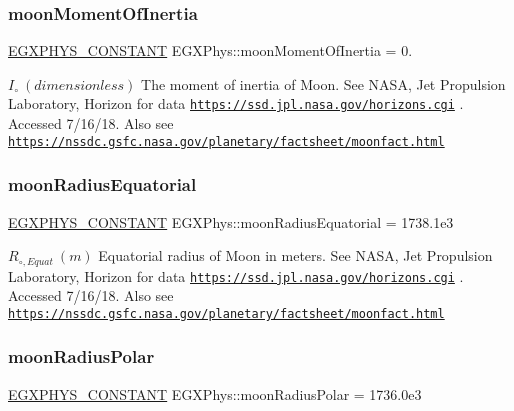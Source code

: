 \subsubsection{\texorpdfstring{moon\+Moment\+Of\+Inertia}{moonMomentOfInertia}}
{\footnotesize\ttfamily \mbox{\hyperlink{group___e_g_x_phys-_constants-_macros_ga76980d288494ce1714c9ac68a95ba702}{E\+G\+X\+P\+H\+Y\+S\+\_\+\+C\+O\+N\+S\+T\+A\+NT}} E\+G\+X\+Phys\+::moon\+Moment\+Of\+Inertia = 0.}

$ I_{\circ} \ (dimensionless)$ The moment of inertia of Moon. See N\+A\+SA, Jet Propulsion Laboratory, Horizon for data \href{https://ssd.jpl.nasa.gov/horizons.cgi}{\tt https\+://ssd.\+jpl.\+nasa.\+gov/horizons.\+cgi} . Accessed 7/16/18. Also see \href{https://nssdc.gsfc.nasa.gov/planetary/factsheet/moonfact.html}{\tt https\+://nssdc.\+gsfc.\+nasa.\+gov/planetary/factsheet/moonfact.\+html} \mbox{\label{group___e_g_x_phys-_constants-_astrophysics-_solar_system-_moon-_bulk_gae64b2ac5706df380350586a156c2fef9}} 
\subsubsection{\texorpdfstring{moon\+Radius\+Equatorial}{moonRadiusEquatorial}}
{\footnotesize\ttfamily \mbox{\hyperlink{group___e_g_x_phys-_constants-_macros_ga76980d288494ce1714c9ac68a95ba702}{E\+G\+X\+P\+H\+Y\+S\+\_\+\+C\+O\+N\+S\+T\+A\+NT}} E\+G\+X\+Phys\+::moon\+Radius\+Equatorial = 1738.\+1e3}

$R_{\circ,Equat} \ (m)$ Equatorial radius of Moon in meters. See N\+A\+SA, Jet Propulsion Laboratory, Horizon for data \href{https://ssd.jpl.nasa.gov/horizons.cgi}{\tt https\+://ssd.\+jpl.\+nasa.\+gov/horizons.\+cgi} . Accessed 7/16/18. Also see \href{https://nssdc.gsfc.nasa.gov/planetary/factsheet/moonfact.html}{\tt https\+://nssdc.\+gsfc.\+nasa.\+gov/planetary/factsheet/moonfact.\+html} \mbox{\label{group___e_g_x_phys-_constants-_astrophysics-_solar_system-_moon-_bulk_ga63eac19f90f28a0639f9a81eaac65d62}} 
\subsubsection{\texorpdfstring{moon\+Radius\+Polar}{moonRadiusPolar}}
{\footnotesize\ttfamily \mbox{\hyperlink{group___e_g_x_phys-_constants-_macros_ga76980d288494ce1714c9ac68a95ba702}{E\+G\+X\+P\+H\+Y\+S\+\_\+\+C\+O\+N\+S\+T\+A\+NT}} E\+G\+X\+Phys\+::moon\+Radius\+Polar = 1736.\+0e3}

